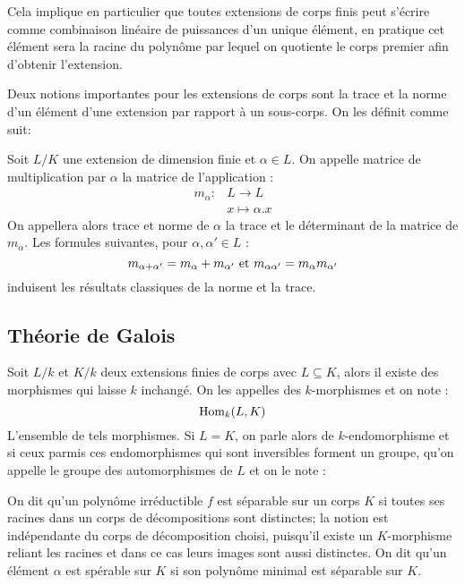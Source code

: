 \documentclass[a4paper]{article} %
\numberwithin{section}{part}
\numberwithin{equation}{section}
\begin{document}
Cela implique en particulier que toutes extensions de corps finis peut s'écrire
comme combinaison linéaire de puissances d'un unique élément, en pratique cet
élément sera la racine du polynôme par lequel on quotiente le corps premier afin
d'obtenir l'extension.
\vspace{0.3cm}

Deux notions importantes pour les extensions de corps sont la trace et la norme
d'un élément d'une extension par rapport à un sous-corps. On les définit comme
suit:

\begin{defn}
Soit $L/K$ une extension de dimension finie et $\alpha\in L$. On appelle matrice
de multiplication par $\alpha$ la matrice de l'application :
\begin{align*}
m_{\alpha} :&L \longrightarrow L\\
&x\longmapsto\alpha.x
\end{align*}
On appellera alors trace et norme de $\alpha$ la trace et le déterminant 
de la matrice de $m_{\alpha}$. Les formules suivantes, pour $\alpha, \alpha'\in
L$ :
\[ m_{\alpha + \alpha'} = m_{\alpha} + m_{\alpha'} \textup{ et }
m_{\alpha\alpha'} = m_{\alpha}m_{\alpha'}\]
induisent les résultats classiques de la norme et la trace.
\end{defn}

\subsection{Théorie de Galois}
Soit $L/k$ et $K/k$ deux extensions finies de corps avec $L\subseteq K$, alors 
il existe des morphismes qui laisse $k$ inchangé. On les appelles des 
$k$-morphismes et on note :
\[\textup{Hom}_k(L, K)\]
L'ensemble de tels morphismes. Si $L = K$, on parle alors de $k$-endomorphisme
et si ceux parmis ces endomorphismes qui sont inversibles forment un groupe,
qu'on appelle le groupe des automorphismes de $L$ et on le note :

\vspace{0.3cm}

On dit qu'un polynôme irréductible $f$ est séparable sur un corps $K$ si toutes
ses racines dans un corps de décompositions sont distinctes; la notion est
indépendante du corps de décomposition choisi, puisqu'il existe un $K$-morphisme
reliant les racines et dans ce cas leurs images sont aussi distinctes. On dit
qu'un élément $\alpha$ est spérable sur $K$ si son polynôme minimal est 
séparable sur $K$.
\end{document}
